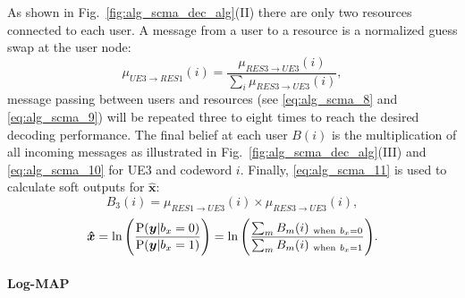 As shown in Fig.~\ref{fig:alg_scma_dec_alg}(II) there are only two resources
connected to each user. A message from a user to a resource is a normalized
guess swap at the user node:
\begin{equation}
  \label{eq:alg_scma_9}
  \mu_{UE3 \rightarrow RES1}(i) = \frac{\mu_{RES3 \rightarrow UE3}(i)}
  {\sum_i\mu_{RES3 \rightarrow UE3}(i)},
\end{equation}
message passing between users and resources (see \eqref{eq:alg_scma_8} and
\eqref{eq:alg_scma_9}) will be repeated three to eight times to reach the
desired decoding performance. The final belief at each user $B(i)$ is the
multiplication of all incoming messages as illustrated in
Fig.~{\ref{fig:alg_scma_dec_alg}}(III) and \eqref{eq:alg_scma_10} for UE3 and
codeword $i$. Finally, \eqref{eq:alg_scma_11} is used to calculate soft outputs
for $\bm{\hat{x}}$:
\begin{equation}
  \label{eq:alg_scma_10}
  B_3(i) = \mu_{RES1 \rightarrow UE3}(i) \times \mu_{RES3 \rightarrow UE3}(i),
\end{equation}
\begin{equation}
  \label{eq:alg_scma_11}
  \bm{\hat{x}} = \ln \Bigg( \frac{\operatorname{P}(\bm{y}|b_x=0)}{\operatorname{P}(\bm{y}|b_x=1)} \Bigg) =
  \ln \Bigg( \frac{\sum_m B_m(i)_{~\text{when}~b_x=0}}{\sum_m B_m(i)_{~\text{when}~b_x=1}}
  \Bigg).
\end{equation}

\paragraph{Log-MAP}
\label{sec:alg_scma_log-map}

